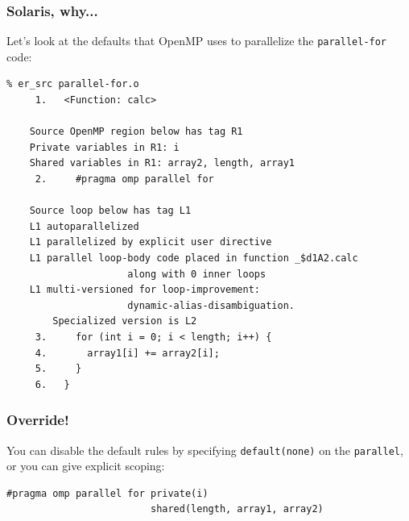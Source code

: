 \begin{frame}[fragile]
  \frametitle{Solaris, why...}


Let's look at the defaults that OpenMP uses to parallelize the {\tt parallel-for} code:
\begin{lstlisting}
% er_src parallel-for.o
     1.   <Function: calc>
    
    Source OpenMP region below has tag R1
    Private variables in R1: i
    Shared variables in R1: array2, length, array1
     2.     #pragma omp parallel for

    Source loop below has tag L1
    L1 autoparallelized
    L1 parallelized by explicit user directive
    L1 parallel loop-body code placed in function _$d1A2.calc 
                     along with 0 inner loops
    L1 multi-versioned for loop-improvement:
                     dynamic-alias-disambiguation. 
        Specialized version is L2
     3.     for (int i = 0; i < length; i++) {
     4.       array1[i] += array2[i];
     5.     }
     6.   }
\end{lstlisting}

\end{frame}


\begin{frame}[fragile]
  \frametitle{Override!}
  
You can disable the default rules
by specifying {\tt default(none)} on the {\tt parallel},
or you can give explicit scoping:

\begin{lstlisting}
#pragma omp parallel for private(i) 
                         shared(length, array1, array2)
\end{lstlisting}



\end{frame}


